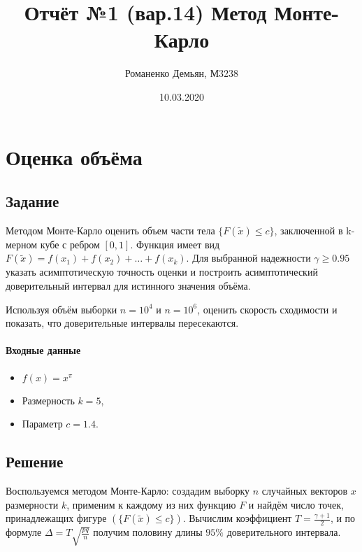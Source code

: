 \documentclass{article}
\title{\textbf{Отчёт №1 (вар.14)} Метод Монте-Карло}
\author{Романенко Демьян, М3238}
\date{10.03.2020}
\begin{document}
	\maketitle
	\newpage

\maketitle
    \section{Оценка объёма}
        \subsection{Задание}
            Методом Монте-Карло оценить объем части тела $\{F(\widetilde{x}) \leq c\}$, заключенной в k-мерном кубе с ребром $[0,1]$. Функция имеет вид $F(\widetilde{x}) = f(x_1) + f(x_2) + \ldots + f(x_k)$. Для выбранной надежности $\gamma \geq 0.95$ указать асимптотическую точность оценки и построить асимптотический доверительный интервал для истинного значения объёма. 
            \newline
            
            Используя объём выборки $n = 10^4$ и $n = 10^6$, оценить скорость сходимости и показать, что доверительные интервалы пересекаются.
            \newline
            
            \paragraph{Входные данные}
                \begin{itemize}
                    \item $f(x) = x^\pi$
                    \item Размерность $k = 5$,
                    \item Параметр $c = 1.4$.
                \end{itemize}
        \subsection{Решение}
            Воспользуемся методом Монте-Карло: создадим выборку $n$ случайных векторов $x$  размерности $k$, применим к каждому из них функцию $F$ и найдём число точек, принадлежащих фигуре $(\{F(\widetilde{x}) \leq c\})$. Вычислим коэффициент $T = \frac{\gamma + 1}{2}$, и по формуле $\Delta = T\sqrt{\frac{pq}{n}}$ получим половину длины $95\%$ доверительного интервала.
\end{document}
